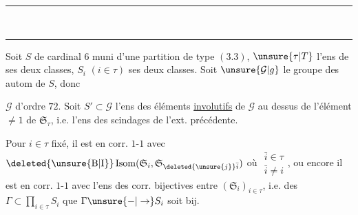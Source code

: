\begin{center}\rule{1.5cm}{.4pt}\\[-.9ex]\hspace{.25cm}\rule{1.25cm}{.4pt}\end{center}
Soit $S$ de cardinal $6$ muni d'une partition  de type $(3.3)$, $\unsure{\tau|T}$ l'ens de ses deux classes, $S_i$ $(i\in\tau)$ ses deux classes. Soit $\unsure{\mathcal G|g}$ le groupe des autom de $S$, donc

$\mathcal G$ d'ordre $72$. Soit $S'\subset\mathcal G$ l'ens des éléments \uline{involutifs} de $\mathcal G$ au dessus de l'élément $\ne1$ de $\mathfrak S_\tau$, i.e. l'ens des scindages de l'ext. précédente.

Pour $i\in\tau$ fixé, il est en corr. $1$-$1$ avec $\deleted{\unsure{\mathrm B|\mathrm I}}\operatorname{Isom}(\mathfrak S_i,\mathfrak S_{\deleted{\unsure{j}}\bar i})$ où $\substack{\bar i\in\tau\\\bar i\ne i}$, ou encore il est en corr. $1$-$1$ avec l'ens des corr. bijectives entre $(\mathfrak S_i)_{i\in\tau}$, i.e. des $\Gamma\subset\prod_{i\in\tau}S_i$  que  $\Gamma\unsure{\mathord{-}|\to} S_i$ soit bij.

